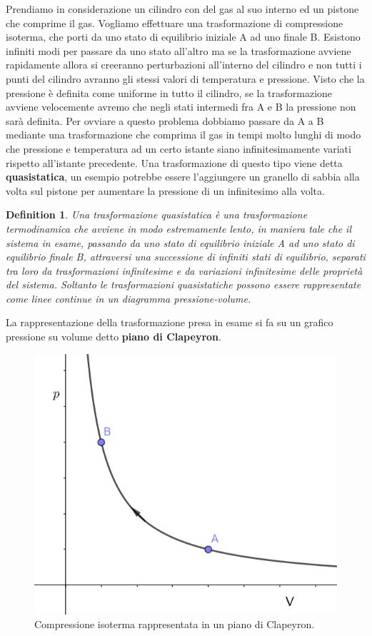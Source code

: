 \documentclass[10pt,a4paper]{article}
\newtheorem{definition}{Definition}
\begin{document}
Prendiamo in considerazione un cilindro con del gas al suo interno ed un pistone che comprime il gas. Vogliamo effettuare una trasformazione di compressione isoterma, che porti da uno stato di equilibrio iniziale A ad uno finale B. Esistono infiniti modi per passare da uno stato all'altro ma se la trasformazione avviene rapidamente allora si creeranno perturbazioni all'interno del cilindro e non tutti i punti del cilindro avranno gli stessi valori di temperatura e pressione. Visto che la pressione è definita come uniforme in tutto il cilindro, se la trasformazione avviene velocemente avremo che negli stati intermedi fra A e B la pressione non sarà definita. Per ovviare a questo problema dobbiamo passare da A a B mediante una trasformazione che comprima il gas in tempi molto lunghi di modo che pressione e temperatura ad un certo istante siano infinitesimamente variati rispetto all'istante precedente. Una trasformazione di questo tipo viene detta \textbf{quasistatica}, un esempio potrebbe essere l'aggiungere un granello di sabbia alla volta sul pistone per aumentare la pressione di un infinitesimo alla volta. 
\begin{definition}
	Una trasformazione quasistatica è una trasformazione termodinamica che avviene in modo estremamente lento, in maniera tale che il sistema in esame, passando da uno stato di equilibrio iniziale A ad uno stato di equilibrio finale B, attraversi una successione di infiniti stati di equilibrio, separati tra loro da trasformazioni infinitesime e da variazioni infinitesime delle proprietà del sistema. Soltanto le trasformazioni quasistatiche possono essere rappresentate come linee continue in un diagramma pressione-volume.
\end{definition} 
La rappresentazione della trasformazione presa in esame si fa su un grafico pressione su volume detto \textbf{piano di Clapeyron}.
\begin{figure}[h!]
	\centering
	\includegraphics[width=0.5\linewidth]{isoterma}
	\caption{Compressione isoterma rappresentata in un piano di Clapeyron.}
	\label{fig:isoterma}
\end{figure}
\end{document}

